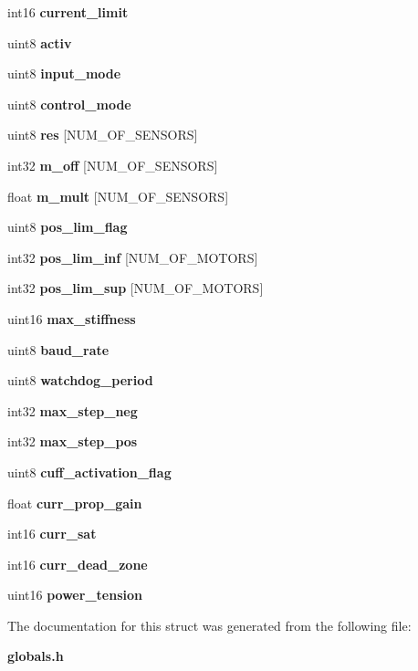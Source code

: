 \begin{DoxyCompactItemize}
int16 {\bfseries current\+\_\+limit}
\item 
\mbox{\label{structst__mem_a63bbebc1db55f43e0571006597a3488b}} 
uint8 {\bfseries activ}
\item 
\mbox{\label{structst__mem_ae5cc8b2ae06016f1fcf5b2f964618a12}} 
uint8 {\bfseries input\+\_\+mode}
\item 
\mbox{\label{structst__mem_af0c55b7d870673f2f6e9521c215d4b51}} 
uint8 {\bfseries control\+\_\+mode}
\item 
\mbox{\label{structst__mem_ac2e19d167eac4c8ca9ce97c646e78595}} 
uint8 {\bfseries res} [N\+U\+M\+\_\+\+O\+F\+\_\+\+S\+E\+N\+S\+O\+RS]
\item 
\mbox{\label{structst__mem_ab544f035124be893918bafb611fe88d9}} 
int32 {\bfseries m\+\_\+off} [N\+U\+M\+\_\+\+O\+F\+\_\+\+S\+E\+N\+S\+O\+RS]
\item 
\mbox{\label{structst__mem_aecf0baab567443534c0ded663b746896}} 
float {\bfseries m\+\_\+mult} [N\+U\+M\+\_\+\+O\+F\+\_\+\+S\+E\+N\+S\+O\+RS]
\item 
\mbox{\label{structst__mem_aa2ceebf7546e978c8b0393ce8035532d}} 
uint8 {\bfseries pos\+\_\+lim\+\_\+flag}
\item 
\mbox{\label{structst__mem_a631265c712a620e03d9233634e1819a2}} 
int32 {\bfseries pos\+\_\+lim\+\_\+inf} [N\+U\+M\+\_\+\+O\+F\+\_\+\+M\+O\+T\+O\+RS]
\item 
\mbox{\label{structst__mem_a818808d7c324999701b5aad40a8fabca}} 
int32 {\bfseries pos\+\_\+lim\+\_\+sup} [N\+U\+M\+\_\+\+O\+F\+\_\+\+M\+O\+T\+O\+RS]
\item 
\mbox{\label{structst__mem_aa20cd7437de72c537fd6bb84c158d51e}} 
uint16 {\bfseries max\+\_\+stiffness}
\item 
\mbox{\label{structst__mem_a1a2b3002580421effeca67955a862580}} 
uint8 {\bfseries baud\+\_\+rate}
\item 
\mbox{\label{structst__mem_a1aae70aad54a04c7b41a8d2dcd7aba14}} 
uint8 {\bfseries watchdog\+\_\+period}
\item 
\mbox{\label{structst__mem_a14fe3ed96d232dced2d33efc493a0667}} 
int32 {\bfseries max\+\_\+step\+\_\+neg}
\item 
\mbox{\label{structst__mem_a9be5987152b8c6bb28c1d311bc94e5e3}} 
int32 {\bfseries max\+\_\+step\+\_\+pos}
\item 
\mbox{\label{structst__mem_a02419b453725a20b3d1a3239415c4062}} 
uint8 {\bfseries cuff\+\_\+activation\+\_\+flag}
\item 
\mbox{\label{structst__mem_a7d09555c03c9da9fd8817bb338b72f81}} 
float {\bfseries curr\+\_\+prop\+\_\+gain}
\item 
\mbox{\label{structst__mem_a265823b08bf0a28fce5b8f88e1484a90}} 
int16 {\bfseries curr\+\_\+sat}
\item 
\mbox{\label{structst__mem_ab5de0972c87f6694962649fc1ad9acba}} 
int16 {\bfseries curr\+\_\+dead\+\_\+zone}
\item 
\mbox{\label{structst__mem_a59ed30e5aa7ccfd0b5f77c0805ac76f3}} 
uint16 {\bfseries power\+\_\+tension}
\end{DoxyCompactItemize}


The documentation for this struct was generated from the following file\+:\begin{DoxyCompactItemize}
\item 
\textbf{ globals.\+h}\end{DoxyCompactItemize}
